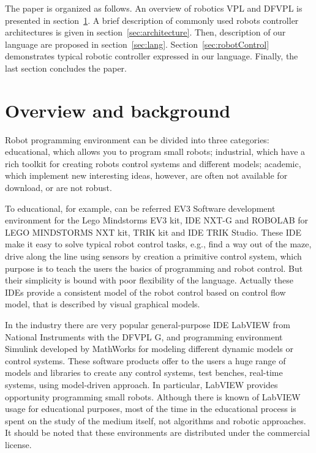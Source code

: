 \documentclass[conference,compsoc]{IEEEtran}
\begin{document}
The paper is organized as follows. An overview of robotics VPL and DFVPL is presented in section~\ref{sec:Overview}. A brief description of commonly used robots controller architectures is given in section~\ref{sec:architecture}. Then, description of our language are proposed in section~\ref{sec:lang}. Section~\ref{sec:robotControl} demonstrates typical robotic controller expressed in our language. Finally, the last section concludes the paper.



\section{Overview and background}
\label{sec:Overview}
Robot programming environment can be divided into three categories: educational, which allows you to program small robots; industrial, which have a rich toolkit for creating robots control systems and different models; academic, which implement new interesting ideas, however, are often not available for download, or are not robust.

To educational, for example, can be referred EV3 Software development environment for the Lego Mindstorms EV3 kit, IDE NXT-G and ROBOLAB for LEGO MINDSTORMS NXT kit, TRIK kit and IDE TRIK Studio. These IDE make it easy to solve typical robot control tasks, e.g., find a way out of the maze, drive along the line using sensors by creation a primitive control system, which purpose is to teach the users the basics of programming and robot control. But their simplicity is bound with poor flexibility of the language. Actually these IDEs provide a consistent model of the robot control based on control flow model, that is described by visual graphical models.

In the industry there are very popular general-purpose IDE LabVIEW from National Instruments with the DFVPL G, and programming environment Simulink developed by MathWorks for modeling different dynamic models or control systems. These software products offer to the users a huge range of models and libraries to create any control systems, test benches, real-time systems, using model-driven approach. In particular, LabVIEW provides opportunity programming small robots. Although there is known of LabVIEW usage for educational purposes\cite{1_gomez-de-gabriel_mandow_fernandez-lozano_garcia-cerezo_2011}, most of the time in the educational process is spent on the study of the medium itself, not algorithms and robotic approaches. It should be noted that these environments are distributed under the commercial license.
\end{document}
